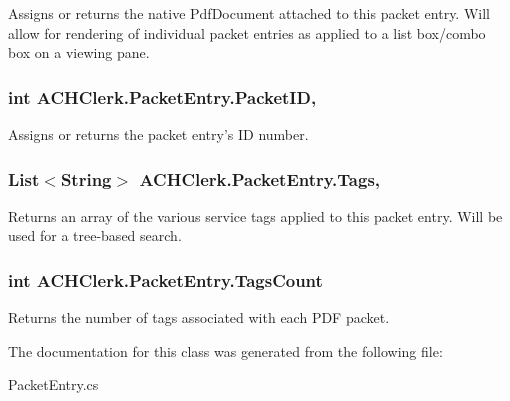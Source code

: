 Assigns or returns the native Pdf\+Document attached to this packet entry. Will allow for rendering of individual packet entries as applied to a list box/combo box on a viewing pane. 

\hypertarget{class_a_c_h_clerk_1_1_packet_entry_a1a2d184afd1ab9b8aaccf0ac9bdb5d62}{
\subsubsection[{Packet\+I\+D}]{\setlength{\rightskip}{0pt plus 5cm}int A\+C\+H\+Clerk.\+Packet\+Entry.\+Packet\+I\+D\hspace{0.3cm}{\ttfamily [get]}, {\ttfamily [set]}}}\label{class_a_c_h_clerk_1_1_packet_entry_a1a2d184afd1ab9b8aaccf0ac9bdb5d62}


Assigns or returns the packet entry's I\+D number. 

\hypertarget{class_a_c_h_clerk_1_1_packet_entry_aa0e26c66a7884c983e91a014b6766f5e}{
\subsubsection[{Tags}]{\setlength{\rightskip}{0pt plus 5cm}List$<$String$>$ A\+C\+H\+Clerk.\+Packet\+Entry.\+Tags\hspace{0.3cm}{\ttfamily [get]}, {\ttfamily [set]}}}\label{class_a_c_h_clerk_1_1_packet_entry_aa0e26c66a7884c983e91a014b6766f5e}


Returns an array of the various service tags applied to this packet entry. Will be used for a tree-\/based search. 

\hypertarget{class_a_c_h_clerk_1_1_packet_entry_ae73ddc1eccfe1906754fbf36101e66eb}{
\subsubsection[{Tags\+Count}]{\setlength{\rightskip}{0pt plus 5cm}int A\+C\+H\+Clerk.\+Packet\+Entry.\+Tags\+Count\hspace{0.3cm}{\ttfamily [get]}}}\label{class_a_c_h_clerk_1_1_packet_entry_ae73ddc1eccfe1906754fbf36101e66eb}


Returns the number of tags associated with each P\+D\+F packet. 



The documentation for this class was generated from the following file\+:\begin{DoxyCompactItemize}
\item 
Packet\+Entry.\+cs\end{DoxyCompactItemize}

